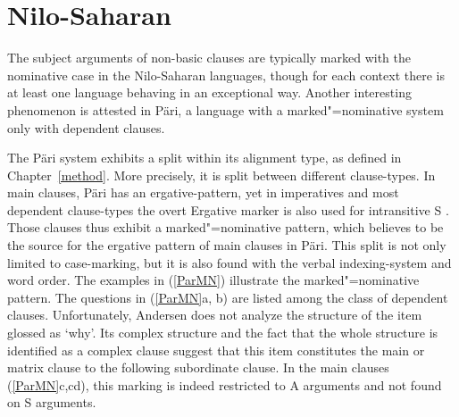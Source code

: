 \section{Nilo-Saharan}\label{NonBasicNilo}

The subject arguments of non-basic clauses are typically marked with the nominative  case in the Nilo-Saharan languages, though for each context there is at least one language behaving in an exceptional way.
Another interesting phenomenon is attested in P\"ari, a language with a marked"=nominative system only with dependent clauses. 

The P\"ari system exhibits a split within its alignment type, as defined in Chapter~\ref{method}. 
More precisely, it is split between different clause-types. 
In main clauses, P\"ari has an ergative-pattern, yet in imperatives and most dependent clause-types the overt Ergative marker is also used for intransitive S \citep[316--319]{Andersen:1988}. 
Those clauses thus exhibit a marked"=nominative pattern, which \citet[316]{Andersen:1988} believes to be the source for the ergative pattern of main clauses in P\"ari.
This split is not only limited to case-marking, but it is also found with the verbal indexing-system and word order.
The examples in (\ref{ParMN}) illustrate the marked"=nominative pattern. 
The questions in (\ref{ParMN}a, b) are listed among the class of dependent clauses. 
Unfortunately, Andersen does not analyze the structure of the item glossed as `why'. 
Its complex structure and the fact that the whole structure is identified as a complex clause suggest that this item constitutes the main or matrix clause to the following subordinate clause. 
In the main clauses (\ref{ParMN}c,cd), this marking is indeed restricted to A arguments and not found on S arguments.

